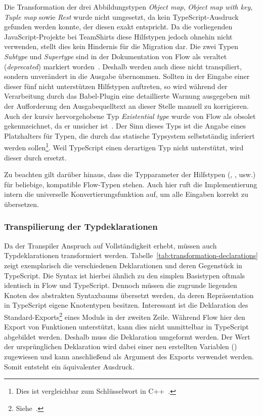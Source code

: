 Die Transformation der drei Abbildungstypen \textit{Object map}, \textit{Object map with key}, \textit{Tuple map} sowie \textit{Rest} wurde nicht umgesetzt, da kein TypeScript-Ausdruck gefunden werden konnte, der diesen exakt entspricht. Da die vorliegenden JavaScript-Projekte bei TeamShirts diese Hilfstypen jedoch ohnehin nicht verwenden, stellt dies kein Hindernis für die Migration dar. Die zwei Typen \textit{Subtype} und \textit{Supertype} sind in der Dokumentation von Flow als veraltet (\textit{deprecated}) markiert worden~\autocite{FLOW:UTILITY_TYPES}. Deshalb werden auch diese nicht transpiliert, sondern unverändert in die Ausgabe übernommen. Sollten in der Eingabe einer dieser fünf nicht unterstützen Hilfstypen auftreten, so wird während der Verarbeitung durch das Babel-Plugin eine detaillierte Warnung ausgegeben mit der Aufforderung den Ausgabequelltext an dieser Stelle manuell zu korrigieren. Auch der kursiv hervorgehobene Typ \textit{Existential type} wurde von Flow als obsolet gekennzeichnet, da er unsicher ist~\autocite{FLOW:LINT_RULE_REFERENCE}. Der Sinn dieses Typs ist die Angabe eines Platzhalters für Typen, die durch das statische Typsystem selbstständig inferiert werden sollen\footnote{Dies ist vergleichbar zum Schlüsselwort  in C++~\autocite[151]{CPP11_SPEC}.}. Weil TypeScript einen derartigen Typ nicht unterstützt, wird dieser durch  ersetzt.

\bigbreak


Zu beachten gilt darüber hinaus, dass die Typparameter der Hilfstypen (, ,  usw.) für beliebige, kompatible Flow-Typen stehen. Auch hier ruft die Implementierung intern die universelle Konvertierungsfunktion  auf, um alle Eingaben korrekt zu übersetzen.

\subsubsection{Transpilierung der Typdeklarationen}

Da der Transpiler Anspruch auf Vollständigkeit erhebt, müssen auch Typdeklarationen transformiert werden. Tabelle~\ref{tab:transformation-declarations} zeigt exemplarisch die verschiedenen Deklarationen und deren Gegenstück in TypeScript. Die Syntax ist hierbei ähnlich zu den simplen Basistypen oftmals identisch in Flow und TypeScript. Dennoch müssen die zugrunde liegenden Knoten des abstrakten Syntaxbaums übersetzt werden, da deren Repräsentation in TypeScript eigene Knotentypen besitzen. Interessant ist die Deklaration des Standard-Exports\footnote{Siehe~\autocite[377]{ECMASCRIPT:2019}.} eines Moduls in der zweiten Zeile. Während Flow hier den Export von Funktionen unterstützt, kann dies nicht unmittelbar in TypeScript abgebildet werden. Deshalb muss die Deklaration umgeformt werden. Der Wert der ursprünglichen Deklaration wird dabei einer neu erstellten Variablen () zugewiesen und kann anschließend als Argument des Exports verwendet werden. Somit entsteht ein äquivalenter Ausdruck.

